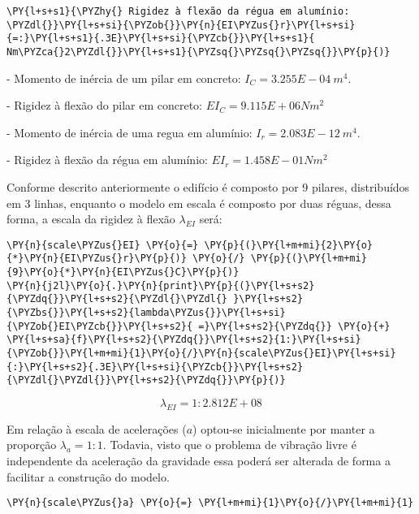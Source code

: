 \begin{tcolorbox}[breakable, size=fbox, boxrule=1pt, pad at break*=1mm,colback=cellbackground, colframe=cellborder]
\begin{Verbatim}[commandchars=\\\{\}]
\PY{l+s+s1}{\PYZhy{} Rigidez à flexão da régua em alumínio: \PYZdl{}}\PY{l+s+si}{\PYZob{}}\PY{n}{EI\PYZus{}r}\PY{l+s+si}{=:}\PY{l+s+s1}{.3E}\PY{l+s+si}{\PYZcb{}}\PY{l+s+s1}{ Nm\PYZca{}2\PYZdl{}}\PY{l+s+s1}{\PYZsq{}\PYZsq{}\PYZsq{}}\PY{p}{)}
\end{Verbatim}
\end{tcolorbox}

    - Momento de inércia de um pilar em concreto: $I_C=3.255E-04 \: m^4$. 

- Rigidez à flexão do pilar em concreto: $EI_C=9.115E+06 Nm^2$

    
    - Momento de inércia de uma regua em alumínio: $I_r=2.083E-12 \: m^4$. 

- Rigidez à flexão da régua em alumínio: $EI_r=1.458E-01 Nm^2$

    
    Conforme descrito anteriormente o edifício é composto por 9 pilares,
distribuídos em 3 linhas, enquanto o modelo em escala é composto por
duas réguas, dessa forma, a escala da rigidez à flexão \(\lambda_{EI}\)
será:

    \begin{tcolorbox}[breakable, size=fbox, boxrule=1pt, pad at break*=1mm,colback=cellbackground, colframe=cellborder]
\begin{Verbatim}[commandchars=\\\{\}]
\PY{n}{scale\PYZus{}EI} \PY{o}{=} \PY{p}{(}\PY{l+m+mi}{2}\PY{o}{*}\PY{n}{EI\PYZus{}r}\PY{p}{)} \PY{o}{/} \PY{p}{(}\PY{l+m+mi}{9}\PY{o}{*}\PY{n}{EI\PYZus{}C}\PY{p}{)}
\PY{n}{j2l}\PY{o}{.}\PY{n}{print}\PY{p}{(}\PY{l+s+s2}{\PYZdq{}}\PY{l+s+s2}{\PYZdl{}\PYZdl{} }\PY{l+s+s2}{\PYZbs{}}\PY{l+s+s2}{lambda\PYZus{}}\PY{l+s+si}{\PYZob{}EI\PYZcb{}}\PY{l+s+s2}{ =}\PY{l+s+s2}{\PYZdq{}} \PY{o}{+} \PY{l+s+sa}{f}\PY{l+s+s2}{\PYZdq{}}\PY{l+s+s2}{1:}\PY{l+s+si}{\PYZob{}}\PY{l+m+mi}{1}\PY{o}{/}\PY{n}{scale\PYZus{}EI}\PY{l+s+si}{:}\PY{l+s+s2}{.3E}\PY{l+s+si}{\PYZcb{}}\PY{l+s+s2}{\PYZdl{}\PYZdl{}}\PY{l+s+s2}{\PYZdq{}}\PY{p}{)}
\end{Verbatim}
\end{tcolorbox}

    $$ \lambda_{EI} =1:2.812E+08$$

    
    Em relação à escala de acelerações (\(a\)) optou-se inicialmente por
manter a proporção \(\lambda_a=1:1\). Todavia, visto que o problema de
vibração livre é independente da aceleração da gravidade essa poderá ser
alterada de forma a facilitar a construção do modelo.

    \begin{tcolorbox}[breakable, size=fbox, boxrule=1pt, pad at break*=1mm,colback=cellbackground, colframe=cellborder]
\begin{Verbatim}[commandchars=\\\{\}]
\PY{n}{scale\PYZus{}a} \PY{o}{=} \PY{l+m+mi}{1}\PY{o}{/}\PY{l+m+mi}{1}
\end{Verbatim}
\end{tcolorbox}

